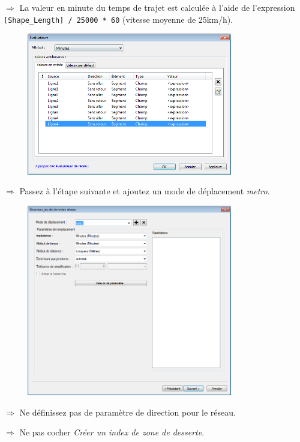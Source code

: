 \documentclass[11pt]{article}
\newcommand{\action}{$\Rightarrow$ }
\begin{document}
\action La valeur en minute du temps de trajet est calculée à l'aide de l'expression \texttt{[Shape\_Length] / 25000 * 60} (vitesse moyenne de 25km/h).
\begin{figure}[H]
	\center \includegraphics[width=0.8\textwidth]{img/td3b/network_analyst-6.png} \\
\end{figure}

\action Passez à l'étape suivante et ajoutez un mode de déplacement \textit{metro}.
\begin{figure}[H]
	\center \includegraphics[width=0.8\textwidth]{img/td3b/network_analyst-7.png} \\
\end{figure}

\action Ne définissez pas de paramètre de direction pour le réseau.

\action Ne pas cocher \textit{Créer un index de zone de desserte}.
\end{document}

